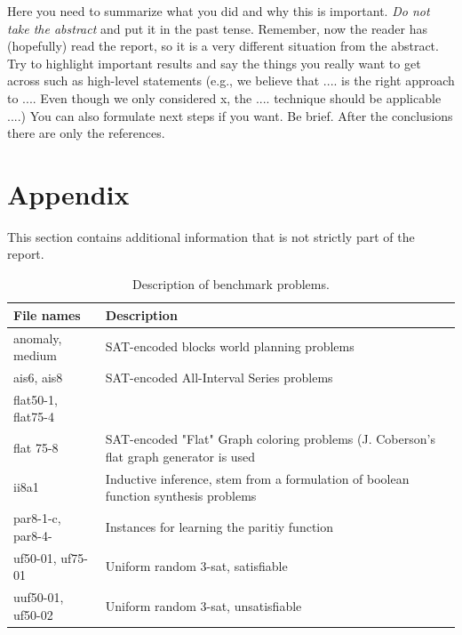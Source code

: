 \documentclass[letterpaper]{article}
\begin{document}
Here you need to summarize what you did and why this is
important. {\em Do not take the abstract} and put it in the past
tense. Remember, now the reader has (hopefully) read the report, so it
is a very different situation from the abstract. Try to highlight
important results and say the things you really want to get across
such as high-level statements (e.g., we believe that .... is the right
approach to .... Even though we only considered x, the
.... technique should be applicable ....) You can also formulate next
steps if you want. Be brief. After the conclusions there are only the references.




\newpage
\section{Appendix}
This section contains additional information that is not strictly part of the report.

\begin{table}[h]
    \centering
    \begin{tabularx}{\columnwidth}{|l|X|}
        \hline
        File names & Description\\
        \hline
        \hline
        anomaly, medium & SAT-encoded blocks world planning problems\\
        \hline
        ais6, ais8 & SAT-encoded All-Interval Series problems\\
        \hline
        flat50-1, flat75-4 \\ flat 75-8 & SAT-encoded "Flat" Graph coloring problems (J. Coberson's flat graph generator is used\\
        \hline
        ii8a1 & Inductive inference, stem from a formulation of boolean function synthesis problems\\
        \hline
        par8-1-c, par8-4- & Instances for learning the paritiy function\\
        \hline
        uf50-01, uf75-01 & Uniform random 3-sat, satisfiable\\
        \hline
        uuf50-01, uf50-02 & Uniform random 3-sat, unsatisfiable\\
        \hline
    \end{tabularx}
    \caption{Description of benchmark problems.}
    \label{tab:benchmark_set}
\end{table}
\end{document}
